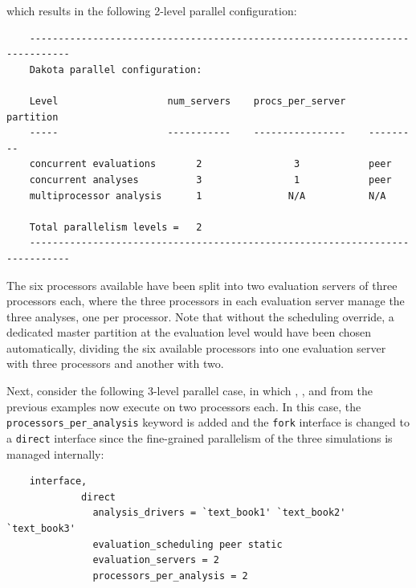 which results in the following 2-level parallel configuration:
\begin{small}
\begin{verbatim}
    -----------------------------------------------------------------------------
    Dakota parallel configuration:

    Level                   num_servers    procs_per_server    partition
    -----                   -----------    ----------------    ---------
    concurrent evaluations       2                3            peer
    concurrent analyses          3                1            peer
    multiprocessor analysis      1               N/A           N/A

    Total parallelism levels =   2
    -----------------------------------------------------------------------------
\end{verbatim}
\end{small}

The six processors available have been split into two evaluation
servers of three processors each, where the three processors in each
evaluation server manage the three analyses, one per processor. Note that
without the scheduling override, a dedicated master partition at the 
evaluation level would have been chosen automatically, dividing
the six available processors into one evaluation server with three 
processors and another with two.

Next, consider the following 3-level parallel case, in which
, , and 
from the previous examples now execute on two processors each. In this
case, the \texttt{processors\_per\_analysis} keyword is added and the
\texttt{fork} interface is changed to a \texttt{direct} interface
since the fine-grained parallelism of the three simulations is managed
internally:
\begin{small}
\begin{verbatim}
    interface,
             direct
               analysis_drivers = `text_book1' `text_book2' `text_book3'
               evaluation_scheduling peer static
               evaluation_servers = 2
               processors_per_analysis = 2
\end{verbatim}
\end{small}

